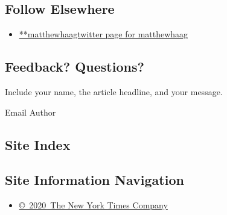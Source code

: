\hypertarget{follow-elsewhere}{%
\subsection{Follow Elsewhere}\label{follow-elsewhere}}

\begin{itemize}
\tightlist
\item
  \href{https://twitter.com/matthewhaag}{**matthewhaagtwitter page for
  matthewhaag}
\end{itemize}

\hypertarget{feedback-questions}{%
\subsection{Feedback? Questions?}\label{feedback-questions}}

Include your name, the article headline, and your message.

Email Author

\hypertarget{site-index}{%
\subsection{Site Index}\label{site-index}}

\hypertarget{site-information-navigation}{%
\subsection{Site Information
Navigation}\label{site-information-navigation}}

\begin{itemize}
\tightlist
\item
  \href{https://help.nytimes3xbfgragh.onion/hc/en-us/articles/115014792127-Copyright-notice}{©~2020~The
  New York Times Company}
\end{itemize}

